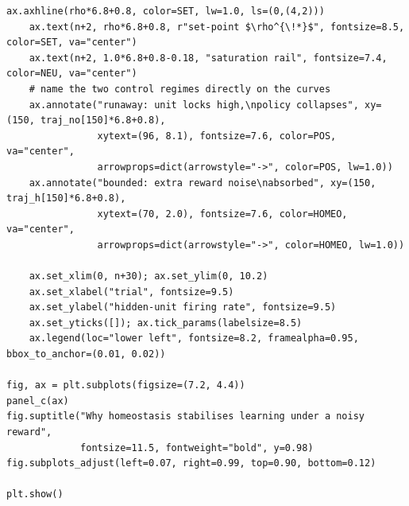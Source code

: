 \begin{lstlisting}[caption={schematics.ipynb code cell 9},label={lst:mrl-nb-schematics-9}]
    ax.axhline(rho*6.8+0.8, color=SET, lw=1.0, ls=(0,(4,2)))
    ax.text(n+2, rho*6.8+0.8, r"set-point $\rho^{\!*}$", fontsize=8.5, color=SET, va="center")
    ax.text(n+2, 1.0*6.8+0.8-0.18, "saturation rail", fontsize=7.4, color=NEU, va="center")
    # name the two control regimes directly on the curves
    ax.annotate("runaway: unit locks high,\npolicy collapses", xy=(150, traj_no[150]*6.8+0.8),
                xytext=(96, 8.1), fontsize=7.6, color=POS, va="center",
                arrowprops=dict(arrowstyle="->", color=POS, lw=1.0))
    ax.annotate("bounded: extra reward noise\nabsorbed", xy=(150, traj_h[150]*6.8+0.8),
                xytext=(70, 2.0), fontsize=7.6, color=HOMEO, va="center",
                arrowprops=dict(arrowstyle="->", color=HOMEO, lw=1.0))

    ax.set_xlim(0, n+30); ax.set_ylim(0, 10.2)
    ax.set_xlabel("trial", fontsize=9.5)
    ax.set_ylabel("hidden-unit firing rate", fontsize=9.5)
    ax.set_yticks([]); ax.tick_params(labelsize=8.5)
    ax.legend(loc="lower left", fontsize=8.2, framealpha=0.95, bbox_to_anchor=(0.01, 0.02))

fig, ax = plt.subplots(figsize=(7.2, 4.4))
panel_c(ax)
fig.suptitle("Why homeostasis stabilises learning under a noisy reward",
             fontsize=11.5, fontweight="bold", y=0.98)
fig.subplots_adjust(left=0.07, right=0.99, top=0.90, bottom=0.12)

plt.show()
\end{lstlisting}

